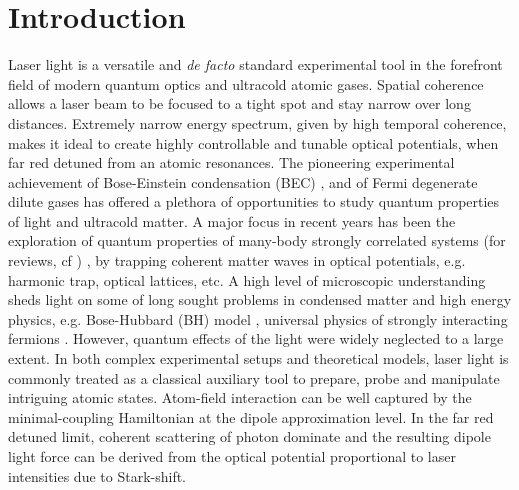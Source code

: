 \documentclass[journal,article,accept,moreauthors,pdftex,12pt,a4paper]{mdpi}
\begin{document}

\section{Introduction}

Laser light is a versatile and {\em de facto} standard experimental tool in the forefront field of modern quantum optics and ultracold atomic gases. Spatial coherence allows a laser beam to be focused to a tight spot and stay narrow over long distances. Extremely narrow energy spectrum, given by high temporal coherence, makes it ideal to create highly controllable and tunable optical potentials, when far red detuned from an atomic resonances. The pioneering experimental achievement of Bose-Einstein condensation (BEC) \cite{BEC1, BEC2, BEC3}, and of Fermi degenerate dilute gases \cite{Fermi1, Fermi2, Fermi3} has offered a plethora of opportunities to study quantum properties of light and ultracold matter. A major focus in recent years has been the exploration of quantum properties of many-body strongly correlated systems (for reviews, cf \cite{Bloch1, Bloch2}) , by trapping coherent matter waves in optical potentials, e.g. harmonic trap, optical lattices, etc. A high level of microscopic understanding sheds light on some of long sought problems in condensed matter and high energy physics, e.g. Bose-Hubbard (BH) model \cite{BH1, BH2}, universal physics of strongly interacting fermions \cite{Fermi4, Fermi5}. However, quantum effects of the light were widely neglected to a large extent. In both complex experimental setups and theoretical models, laser light is commonly treated as a classical auxiliary tool to prepare, probe and manipulate intriguing atomic states. Atom-field interaction can be well captured by the minimal-coupling Hamiltonian at the dipole approximation level. In the far red detuned limit, coherent scattering of photon dominate and the resulting dipole light force can be derived from the optical potential proportional to laser intensities due to Stark-shift. 
\end{document}
